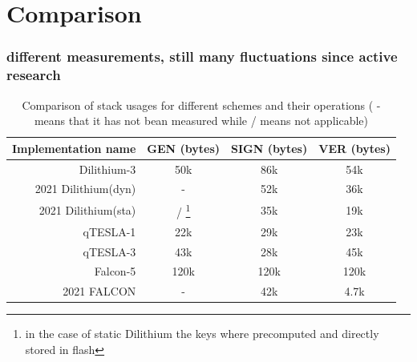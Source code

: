 \documentclass[ucs,10pt]{beamer}
\begin{document}
\section{Comparison}
\begin{frame}[allowframebreaks]
  \frametitle{different measurements, still many fluctuations since active research}

  \begin{table}%
    \caption{Comparison of stack usages for different schemes and their operations ( - means that it has not bean measured while / means not applicable)}
    \label{t:stack_comp}
    \centering\begin{tabular}{| r | c c c |}
        \hline
        Implementation name                     & GEN (bytes) & SIGN (bytes) & VER (bytes)\\
        \hline
        Dilithium-3 \cite{QR_Iot_Lattice}       & 50k       & 86k   & 54k\\
        2021 Dilithium(dyn)\cite{update_sign}   & -         & 52k   & 36k\\
        2021 Dilithium(sta)\cite{update_sign}   & / \footnote{in the case of static Dilithium the keys where precomputed and directly stored in flash} & 35k   & 19k\\ %
        qTESLA-1 \cite{QR_Iot_Lattice}          & 22k       & 29k   & 23k\\
        qTESLA-3 \cite{QR_Iot_Lattice}          & 43k       & 28k   & 45k\\
        Falcon-5  \cite{QR_Iot_Lattice}         & 120k      & 120k  & 120k\\
        2021 FALCON \cite{update_sign}          & -         & 42k   & 4.7k\\
        \hline
    \end{tabular}
\end{table}


\end{frame}
\end{document}
